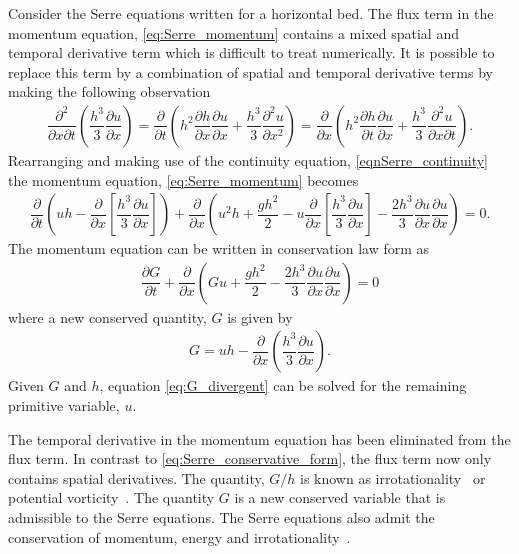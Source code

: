 \documentclass[preprint,sort&compress,1p]{article}
\begin{document}
Consider the Serre equations written for a horizontal bed. The flux term in the momentum equation, \eqref{eq:Serre_momentum} contains a mixed spatial and temporal derivative term which is difficult to treat numerically. It is possible to replace this term  by a combination of spatial and temporal derivative terms by making the following observation
\begin{gather}
\dfrac{\partial^2}{\partial x \partial t} \left ( \dfrac{h^3}{3} \dfrac{\partial u}{\partial x} \right ) = \dfrac{\partial }{\partial t} \left ( h^2 \dfrac{\partial h}{\partial x} \dfrac{\partial u}{\partial x} + \dfrac{h^3}{3} \dfrac{\partial^2 u}{\partial x^2} \right ) =
\dfrac{\partial }{\partial x} \left ( h^2 \dfrac{\partial h}{\partial t} \dfrac{\partial u}{\partial x} + \dfrac{h^3}{3} \dfrac{\partial^2 u}{\partial x \partial t} \right ).
\end{gather}
Rearranging and making use of the continuity equation, \eqref{eqnSerre_continuity} the momentum equation, \eqref{eq:Serre_momentum} becomes
\begin{gather}
\dfrac{\partial }{\partial t} \left ( u h -  \dfrac{\partial}{\partial x} \left [ \dfrac{h^3}{3} \dfrac{\partial u}{\partial x}  \right ] \right ) + \dfrac{\partial}{\partial x} \left ( u^2h + \dfrac{gh^2}{2} - u \dfrac{\partial }{\partial x} \left [ \dfrac{h^3}{3} \dfrac{\partial u}{\partial x} \right ] - \dfrac{2h^3}{3}\dfrac{\partial u}{\partial x}\dfrac{\partial u}{\partial x} \right ) = 0.
\end{gather}
The momentum equation can be written in conservation law form as
\begin{gather}\label{eq:G_momentum}
\dfrac{\partial G}{\partial t} + \dfrac{\partial }{\partial x} \left ( Gu + \dfrac{gh^2}{2} - \dfrac{2 h^3}{3} \dfrac{\partial u}{\partial x} \dfrac{\partial u}{\partial x} \right ) = 0
\end{gather}
where a new conserved quantity, $G$ is given by
\begin{gather}\label{eq:G_divergent}
G = uh - \dfrac{\partial }{\partial x} \left ( \dfrac{h^3}{3} \dfrac{\partial u}{\partial x} \right ).
\end{gather}
Given $G$ and $h$, equation \eqref{eq:G_divergent} can be solved for the remaining primitive variable, $u$.

The temporal derivative in the momentum equation has been eliminated from the flux term. In contrast to \eqref{eq:Serre_conservative_form}, the flux term now only contains spatial derivatives. The quantity, $G/h$ is known as irrotationality~\cite{Carter-Cienfuegos-2010-259} or potential vorticity~\cite{Dias-Milewski-2010}. The quantity $G$ is a new conserved variable that is admissible to the Serre equations. The Serre equations also admit the conservation of momentum, energy and irrotationality~\cite{Bonneton-etal-2011-1479,Carter-Cienfuegos-2010-259}.
\end{document}

